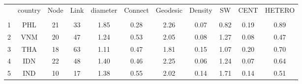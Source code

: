 \begin{table} 
    \begin{tabular}{ c c c c c c c c c c c }
        \hline & country & Node & Link & diameter & Connect & Geodesic & Density & SW & CENT & HETERO \\ 
         \\ 
        \hline
        1 & PHL & 21 & 33 & 1.85 & 0.28 & 2.26 & 0.07 & 0.82 & 0.19 & 0.89 \\ 
        2 & VNM & 20 & 47 & 1.24 & 0.53 & 2.05 & 0.08 & 1.27 & 0.08 & 0.47 \\ 
        3 & THA & 18 & 63 & 1.11 & 0.47 & 1.81 & 0.15 & 1.07 & 0.20 & 0.70 \\ 
        4 & IDN & 22 & 48 & 1.40 & 0.46 & 2.25 & 0.06 & 1.24 & 0.07 & 0.64 \\ 
        5 & IND & 10 & 17 & 1.38 & 0.55 & 2.02 & 0.14 & 1.71 & 0.14 & 0.51 \\ 
    \end{tabular} 
\end{table}